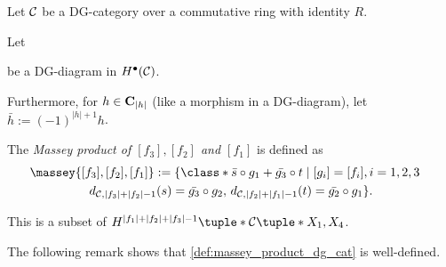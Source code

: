 \begin{definition}
    \label{def:massey_product_dg_cat}
    Let \( {\mathcal{C}} \) be a DG-category over a commutative ring with identity \( R \).

    Let 
    \begin{center}
    \end{center}
    be a DG-diagram in \( H^\bullet({\mathcal{C}}) \).

    Furthermore, for \( h \in \operatorname{\mathbf{C}}_{|h|} \) (like a morphism in a DG-diagram), let \( \bar{h} := (-1)^{|h| + 1}h \).

    The \emph{Massey product of \( [f_3], [f_2] \) and \( [f_1] \)} is defined as
    \begin{multline*}
        \massey{[f_3], [f_2], [f_1]} :=
        \{
            \class*{
                \bar{s} \circ g_1 + \bar{g_3} \circ t
            }
            \mid [g_i] = [f_i], i = 1, 2, 3 \quad \\
            d_{\Cc, |f_3| + |f_2| - 1}(s) = \bar{g_3} \circ g_2, \,
            d_{\Cc, |f_2| + |f_1| - 1}(t) = \bar{g_2} \circ g_1
        \}.
    \end{multline*}

    This is a subset of \( H^{|f_1| + |f_2| + |f_3| - 1}\tuple*{\Cc\tuple*{X_1, X_4}} \).
\end{definition}

The following remark shows that \autoref{def:massey_product_dg_cat} is well-defined.

